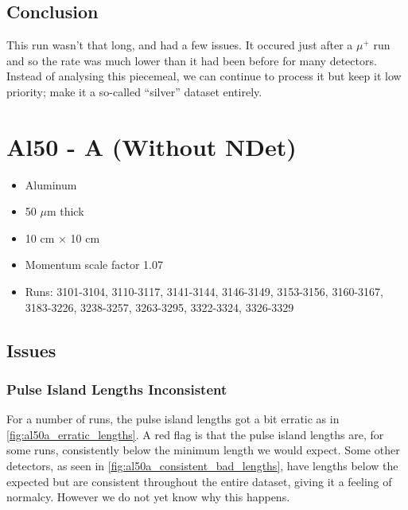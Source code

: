 \documentclass[a4paper]{article}
\begin{document}
\subsection{Conclusion}

This run wasn't that long, and had a few issues. It occured just after a $\mu^+$ run and so the rate was
much lower than it had been before for many detectors. Instead of analysing this piecemeal, we can continue to process
it but keep it low priority; make it a so-called ``silver'' dataset entirely.


\section{Al50 - A (Without NDet)}
\begin{itemize}
  \item Aluminum
  \item 50 $\mu$m thick
  \item 10 cm $\times$ 10 cm
  \item Momentum scale factor 1.07
  \item Runs:
    3101-3104, 3110-3117, 3141-3144,
    3146-3149, 3153-3156, 3160-3167,
    3183-3226, 3238-3257, 3263-3295,
    3322-3324, 3326-3329
\end{itemize}


\subsection{Issues}

\subsubsection{Pulse Island Lengths Inconsistent}
\label{sec:al50a_tpi_length_incosnsistent}
For a number of runs, the pulse island lengths got a bit erratic as in \ref{fig:al50a_erratic_lengths}.
A red flag is that the pulse island lengths are, for some runs, consistently below the minimum length we would expect.
Some other detectors, as seen in \ref{fig:al50a_consistent_bad_lengths}, have lengths below the expected but
are consistent throughout the entire dataset, giving it a feeling of normalcy. However we do not yet know why this happens.
\end{document}
